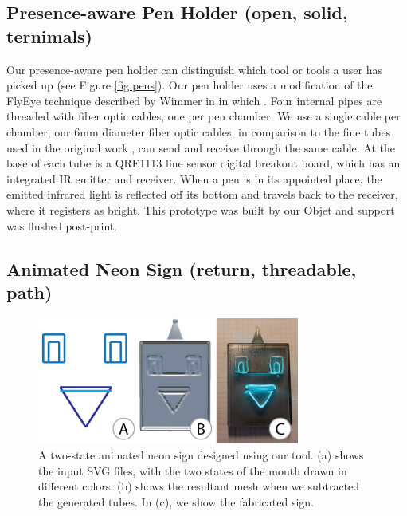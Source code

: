 \subsection{Presence-aware Pen Holder (open, solid, ternimals)}
 
Our presence-aware pen holder can distinguish which tool or tools a user has picked up (see Figure \ref{fig:pens}).  Our pen holder uses a modification of the FlyEye technique described by Wimmer in \cite{Wimmer-flyeye} in which . Four internal pipes are threaded with fiber optic cables, one per pen chamber.  We use a single cable per chamber; our 6mm diameter fiber optic cables, in comparison to the fine tubes used in the original work , can send and receive through the same cable.   At the base of each tube is a QRE1113 line sensor digital breakout board, which has an integrated IR emitter and receiver.   When a pen is in its appointed place, the emitted infrared light is reflected off its bottom and travels back to the receiver, where it registers as bright.  This prototype was built by our Objet and support was flushed post-print. 

\subsection{Animated Neon Sign (return, threadable, path)}

\begin{figure}[h!]
\centering
    \includegraphics[width=3.4in]{figures/sign.png}
\caption{A two-state animated neon sign designed using our tool.  (a) shows the input SVG files, with the two states of the mouth drawn in different colors.   (b) shows the resultant mesh when we subtracted the generated tubes.  In (c), we show the fabricated sign.}
\label{fig:neon}
\end{figure}

